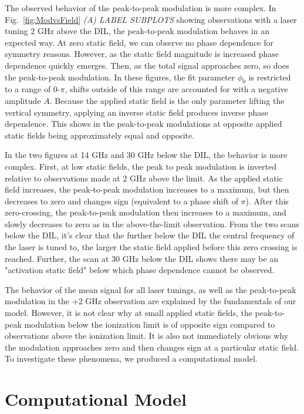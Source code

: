 \documentclass[aps,pra,preprint,groupedaddress]{revtex4-1}
\begin{document}
The observed behavior of the peak-to-peak modulation is more complex. In Fig.~\ref{fig:ModvsField} \emph{(A) LABEL SUBPLOTS} showing observations with a laser tuning 2 GHz above the DIL, the peak-to-peak modulation behaves in an expected way. At zero static field, we can observe no phase dependence for symmetry reasons. However, as the static field magnitude is increased phase dependence quickly emerges. Then, as the total signal approaches zero, so does the peak-to-peak modulation. In these figures, the fit parameter $\phi_0$ is restricted to a range of 0-$\pi$, shifts outside of this range are accounted for with a negative amplitude $A$. Because the applied static field is the only parameter lifting the vertical symmetry, applying an inverse static field produces inverse phase dependence. This shows in the peak-to-peak modulations at opposite applied static fields being approximately equal and opposite.

In the two figures at 14 GHz and 30 GHz below the DIL, the behavior is more complex. First, at low static fields, the peak to peak modulation is inverted relative to observations made at 2 GHz above the limit. As the applied static field increases, the peak-to-peak modulation increases to a maximum, but then decreases to zero and changes sign (equivalent to a phase shift of $\pi$). After this zero-crossing, the peak-to-peak modulation then increases to a maximum, and slowly decreases to zero as in the above-the-limit observation. From the two scans below the DIL, it's clear that the further below the DIL the central frequency of the laser is tuned to, the larger the static field applied before this zero crossing is reached. Further, the scan at 30 GHz below the DIL shows there may be an "activation static field" below which phase dependence cannot be observed.

The behavior of the mean signal for all laser tunings, as well as the peak-to-peak modulation in the +2 GHz observation are explained by the fundamentals of our model. However, it is not clear why at small applied static fields, the peak-to-peak modulation below the ionization limit is of opposite sign compared to observations above the ionization limit. It is also not immediately obvious why the modulation approaches zero and then changes sign at a particular static field. To investigate these phenomena, we produced a computational model.

\section{Computational Model}
\label{sec:comp}
\end{document}
